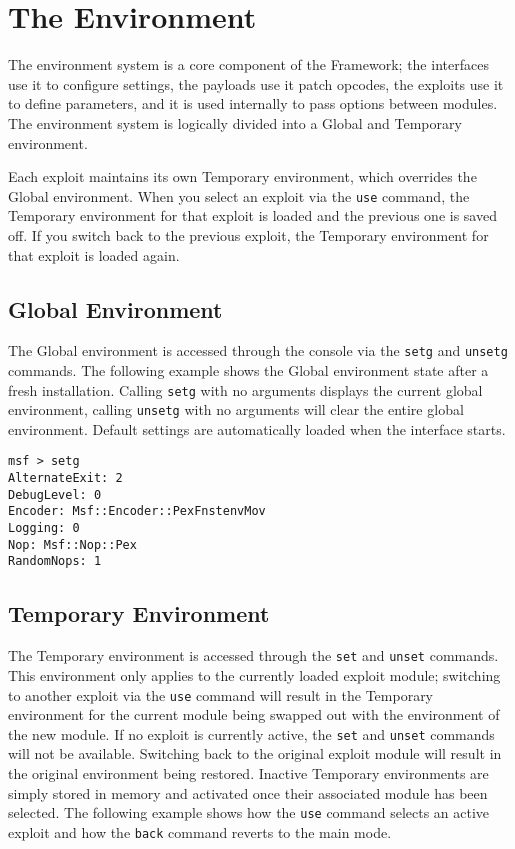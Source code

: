 \documentclass{report}
\begin{document}
\pagebreak
\chapter{The Environment}

\par
The environment system is a core component of the Framework; the interfaces use
it to configure settings, the payloads use it patch opcodes, the exploits
use it to define parameters, and it is used internally to pass options between
modules. The environment system is logically divided into a Global and Temporary environment.  

\par
Each exploit maintains its own Temporary environment, which overrides the Global
environment. When you select an exploit via the \texttt{use} command, the
Temporary environment for that exploit is loaded and the previous one is saved
off. If you switch back to the previous exploit, the Temporary environment for
that exploit is loaded again.   

    \section{Global Environment}
    \label{ENV-GLOBAL}
\par
The Global environment is accessed through the console via the \texttt{setg} and
\texttt{unsetg} commands. The following example shows the Global environment
state after a fresh installation. Calling \texttt{setg} with no arguments
displays the current global environment, calling \texttt{unsetg} with no
arguments will clear the entire global environment. Default settings are
automatically loaded when the interface starts.


\begin{verbatim}
msf > setg
AlternateExit: 2
DebugLevel: 0
Encoder: Msf::Encoder::PexFnstenvMov
Logging: 0
Nop: Msf::Nop::Pex
RandomNops: 1
\end{verbatim}


    \section{Temporary Environment}
    \label{ENV-TEMP}
\par

The Temporary environment is accessed through the \texttt{set} and
\texttt{unset} commands. This environment only applies to the currently loaded
exploit module; switching to another exploit via the \texttt{use} command will
result in the Temporary environment for the current module being swapped out
with the environment of the new module. If no exploit is currently active, the
\texttt{set} and \texttt{unset} commands will not be available. Switching back
to the original exploit module will result in the original environment being
restored. Inactive Temporary environments are simply stored in memory and
activated once their associated module has been selected. The following example
shows how the \texttt{use} command selects an active exploit and how the
\texttt{back} command reverts to the main mode.  
\end{document}
